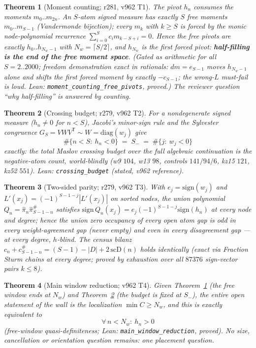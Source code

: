 \documentclass[11pt]{article}
\newtheorem{theorem}{Theorem}[section]
\theoremstyle{definition}
\theoremstyle{remark}
\begin{document}
\begin{theorem}[Moment counting; r281, v962 T1]\label{thm:counting}
The pivot $h_n$ consumes the moments $m_0..m_{2n}$.  An $S$-atom signed
measure has exactly $S$ free moments $m_0..m_{S-1}$ (Vandermonde
bijection); every $m_k$ with $k\ge S$ is forced by the monic
node-polynomial recurrence $\sum_{i=0}^{S}c_im_{k-S+i}=0$.  Hence the
\emph{free} pivots are exactly $h_0..h_{N_w-1}$ with
$N_w=\lceil S/2\rceil$, and $h_{N_w}$ is the first forced pivot:
\textbf{half-filling is the end of the free moment space}.  (Gated as
arithmetic for all $S=2..2000$; freedom demonstration exact in
rationals: $dm=e_{S-1}$ moves $h_{N_w-1}$ alone and shifts the first
forced moment by exactly $-c_{S-1}$; the wrong-$L$ must-fail is loud.
Lean: \texttt{moment\_counting\_free\_pivots}, proved.)  The reviewer
question ``why half-filling'' is answered by counting.
\end{theorem}

\begin{theorem}[Crossing budget; r279, v962 T2]\label{thm:budget}
For a nondegenerate signed measure ($h_n\ne0$ for $n<S$), Jacobi's
minor-sign rule and the Sylvester congruence $G_S=VWV^{\mathsf T}\sim
W=\mathrm{diag}(w_j)$ give
\[
\#\{n<S:\ h_n<0\}\;=\;S_-\;=\;\#\{j:\ w_j<0\}
\]
exactly: the total Maslov crossing budget over the full algebraic
continuation is the negative-atom count, \emph{world-blindly} (w9
$104$, w13 $98$, controls $141/94/6$, kz15 $121$, kz52 $551$).  Lean:
\texttt{crossing\_budget} (stated, v962 reference).
\end{theorem}

\begin{theorem}[Two-sided parity; r279, v962 T3]\label{thm:parity}
With $e_j=\mathrm{sign}(w_j)$ and $L'(x_j)=(-1)^{S-1-j}|L'(x_j)|$ on
sorted nodes, the union polynomial
$Q_n=\hat\pi_n\hat\pi^{\#}_{S-1-n}$ satisfies
$\mathrm{sign}\,Q_n(x_j)=e_j(-1)^{S-1-j}\mathrm{sign}(h_n)$ at every
node and degree; hence the union zero occupancy of every open atom gap
is \emph{odd} in every weight-agreement gap (never empty) and
\emph{even} in every disagreement gap --- at every degree, $h$-blind.
The census bilanz $c_n+c^{\#}_{S-1-n}=(S-1)-|D|+2\,\mathrm{scD}(n)$
holds identically (exact via Fraction Sturm chains at every degree;
proved by exhaustion over all $87376$ sign-vector pairs $k\le8$).
\end{theorem}

\begin{theorem}[Main window reduction; v962 T4]\label{thm:reduction}
Given Theorem~\ref{thm:counting} (the free window ends at $N_w$) and
Theorem~\ref{thm:budget} (the budget is fixed at $S_-$), the entire
open statement of the wall is the localization $\min C\ge N_w$, and
this is exactly equivalent to
\[
\forall\,n<N_w:\ h_n>0
\]
(free-window quasi-definiteness; Lean:
\texttt{main\_window\_reduction}, proved).  No size, cancellation or
orientation question remains: one placement question.
\end{theorem}
\end{document}
